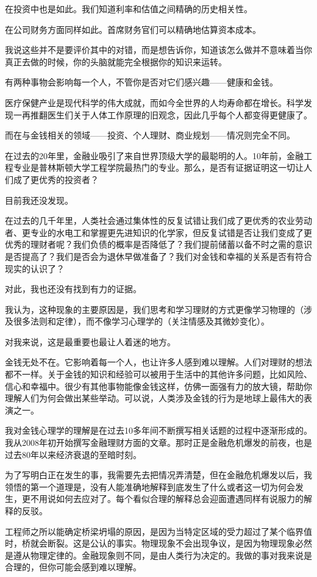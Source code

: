 在投资中也是如此。我们知道利率和估值之间精确的历史相关性。

在公司财务方面同样如此。首席财务官们可以精确地估算资本成本。

我说这些并不是要评价其中的对错，而是想告诉你，知道该怎么做并不意味着当你真正去做的时候，你的头脑就能完全根据你的知识来运转。

有两种事物会影响每一个人，不管你是否对它们感兴趣——健康和金钱。

医疗保健产业是现代科学的伟大成就，而如今全世界的人均寿命都在增长。科学发现一再推翻医生们关于人体工作原理的旧观念，因此几乎每个人都变得更健康了。

而在与金钱相关的领域——投资、个人理财、商业规划——情况则完全不同。

在过去的20年里，金融业吸引了来自世界顶级大学的最聪明的人。10年前，金融工程专业是普林斯顿大学工程学院最热门的专业。那么，是否有证据证明这一切让人们成了更优秀的投资者？

目前我还没发现。

在过去的几千年里，人类社会通过集体性的反复试错让我们成了更优秀的农业劳动者、更专业的水电工和掌握更先进知识的化学家，但反复试错是否让我们变成了更优秀的理财者呢？我们负债的概率是否降低了？我们提前储蓄以备不时之需的意识是否提高了？我们是否会为退休早做准备了？我们对金钱和幸福的关系是否有符合现实的认识了？

对此，我也还没有找到有力的证据。

我认为，这种现象的主要原因是，我们思考和学习理财的方式更像学习物理的（涉及很多法则和定律），而不像学习心理学的（关注情感及其微妙变化）。

对我来说，这是最重要也最让人着迷的地方。

金钱无处不在。它影响着每一个人，也让许多人感到难以理解。人们对理财的想法都不一样。关于金钱的知识和经验可以被用于生活中的其他许多问题，比如风险、信心和幸福中。很少有其他事物能像金钱这样，仿佛一面强有力的放大镜，帮助你理解人们为何会做出某些举动。可以说，人类涉及金钱的行为是地球上最伟大的表演之一。

我对金钱心理学的理解是在过去10多年间不断撰写相关话题的过程中逐渐形成的。我从2008年初开始撰写金融理财方面的文章。那时正是金融危机爆发的前夜，也是过去80年以来经济衰退的至暗时刻。

为了写明白正在发生的事，我需要先去把情况弄清楚，但在金融危机爆发以后，我领悟的第一个道理是，没有人能准确地解释到底发生了什么或者这一切为何会发生，更不用说如何去应对了。每个看似合理的解释总会迎面遭遇同样有说服力的解释的反驳。

工程师之所以能确定桥梁坍塌的原因，是因为当特定区域的受力超过了某个临界值时，桥就会断裂。这是公认的事实。物理现象不会出现争议，是因为物理现象必然是遵从物理定律的。金融现象则不同，是由人类行为决定的。我做的事对我来说是合理的，但你可能会感到难以理解。

